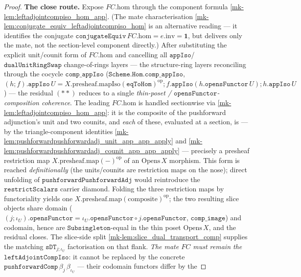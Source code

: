 \begin{proof}
  \textbf{The close route.} Expose \(FC.\mathrm{hom}\) through the component formula
  \ref{mk-lem:leftadjointcompiso_hom_app}. (The mate characterisation
  \ref{mk-lem:conjugate_equiv_leftadjointcompiso_hom} is an alternative reading --- it identifies the
  conjugate \(\mathtt{conjugateEquiv}\,FC.\mathrm{hom} = e.\mathrm{inv} = \mathbf 1\), but delivers only
  the mate, not the section-level component directly.) After
  substituting the explicit unit/counit form of \(FC.\mathrm{hom}\) and cancelling all
  \(\mathtt{appIso}\)/\(\mathtt{dualUnitRingSwap}\) change-of-rings layers --- the structure-ring layers
  reconciling through the cocycle \(\mathtt{comp\_appIso}\) (\(\mathtt{Scheme.Hom.comp\_appIso}\),
  \((h \mathbin{;} f).\mathtt{appIso}\,U = X.\mathrm{presheaf}.\mathrm{mapIso}(\mathtt{eqToHom})^{\mathrm{op}}
  \mathbin{;} f.\mathtt{appIso}(h.\mathtt{opensFunctor}\,U) \mathbin{;} h.\mathtt{appIso}\,U\)) ---
  the residual \((**)\) reduces to a single \emph{thin-poset / \(\mathtt{opensFunctor}\)-composition
  coherence}. The leading \(FC.\mathrm{hom}\) is handled sectionwise via \ref{mk-lem:leftadjointcompiso_hom_app}: it is the composite of the pushforward adjunction's
  unit and two counits, and \emph{each} of these, evaluated at a section, is --- by the triangle-component
  identities \ref{mk-lem:pushforwardpushforwardadj_unit_app_app_apply} and
  \ref{mk-lem:pushforwardpushforwardadj_counit_app_app_apply} --- precisely a presheaf restriction map
  \(X.\mathrm{presheaf}.\mathrm{map}(-)^{\mathrm{op}}\) of an \(\mathrm{Opens}\,X\) morphism. This form is
  reached \emph{definitionally} (the units/counits are restriction maps on the nose); direct unfolding
  of \(\mathtt{pushforwardPushforwardAdj}\) would reintroduce the
  \(\mathtt{restrictScalars}\) carrier diamond. Folding the three restriction maps by functoriality
  yields one \(X.\mathrm{presheaf}.\mathrm{map}(\text{composite})^{\mathrm{op}}\); the two resulting
  slice objects share domain (\((j\mathbin{;}\iota_U).\mathtt{opensFunctor} =
  \iota_U.\mathtt{opensFunctor}\circ j.\mathtt{opensFunctor}\), \(\mathtt{comp\_image}\)) and codomain,
  hence are \(\mathtt{Subsingleton}\)-equal in the thin poset \(\mathrm{Opens}\,X\), and the residual
  closes. The slice-side split \ref{mk-lem:slice_dual_transport_comp} supplies the matching
  \(\mathtt{sDT}_{j\mathbin{;}\iota_U}\) factorisation on that flank. \emph{The mate \(FC\) must remain
  the \(\mathtt{leftAdjointCompIso}\)}: it cannot be replaced by the concrete
  \(\mathtt{pushforwardComp}\,\beta_j\,\beta_{\iota_U}\) --- their codomain functors differ by the

\end{proof}
